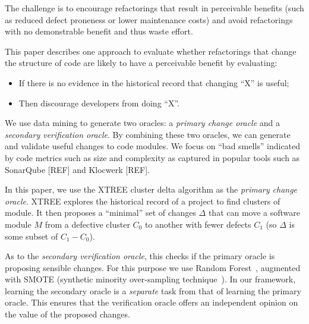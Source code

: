 \documentclass[twocolumn,5p]{elsarticle}
\newcommand{\bi}{\begin{itemize}[leftmargin=0.4cm]}
\newcommand{\ei}{\end{itemize}}
\theoremstyle{break}
\begin{document}
 
The challenge is to encourage refactorings that result in perceivable benefits (such as reduced defect proneness or lower maintenance costs) and avoid refactorings with no demonstrable benefit and thus waste effort.

This paper describes one approach to evaluate whether refactorings that change the structure of code are likely to have a perceivable benefit by evaluating:
\bi
\item If there is no evidence in the historical record that changing ``X'' is useful;
\item Then discourage developers from doing ``X''.
\ei
We use data mining to generate two oracles: a {\em primary
change oracle} and a {\em secondary verification oracle}.
By combining these two oracles,
 we can generate and validate useful
changes to code modules. We focus on ``bad smells'' indicated by code metrics such as size and complexity as captured in popular tools such as SonarQube [REF] and Klocwerk [REF].

In this paper, we use 
the XTREE cluster delta algorithm as the {\em primary change  oracle}.
XTREE 
explores the historical record of a project to find clusters of module.
It then proposes a ``minimal'' set of changes $\Delta$ that can move a software module $M$ from a defective cluster $C_0$ to another with fewer defects $C_1$ (so $\Delta$
is some subset of $C_1 - C_0$). %

As to 
the {\em secondary verification oracle}, this  checks if the primary oracle is proposing
sensible changes. For this purpose we use Random Forest~\cite{breiman2001random}, augmented with SMOTE (synthetic  minority over-sampling technique~\cite{chawla2002smote}).
 In our framework,  learning
the secondary oracle is   a {\em separate} task from that of learning the primary
oracle. This  ensures that the verification oracle offers an independent
opinion on the value of the proposed changes.
\end{document}
